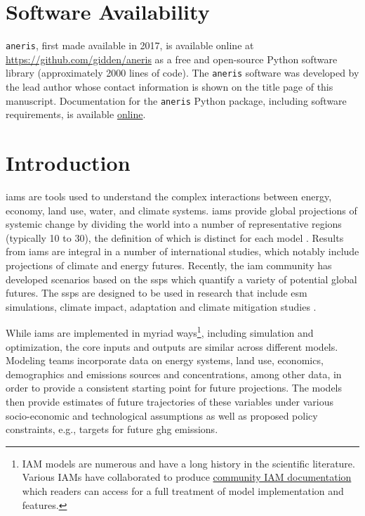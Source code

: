 \documentclass[review]{elsarticle}
\begin{document}
\linenumbers

\newpage
\section*{Software Availability}

\texttt{aneris}, first made available in 2017, is available online at
\url{https://github.com/gidden/aneris} as a free and open-source Python software
library (approximately 2000 lines of code). The \texttt{aneris} software was
developed by the lead author whose contact information is shown on the title
page of this manuscript. Documentation for the \texttt{aneris} Python package,
including software requirements, is available
\href{http://mattgidden.com/aneris/}{online}.

\newpage

\section{Introduction}

\glspl{iam} are tools used to understand the complex interactions between
energy, economy, land use, water, and climate systems. \glspl{iam} provide
global projections of systemic change by dividing the world into a number of
representative regions (typically 10 to 30), the definition of which is distinct
for each model \cite{krey_global_2014}. Results from \glspl{iam} are integral in
a number of international studies, which notably include projections of climate
and energy futures. Recently, the \gls{iam} community has developed scenarios
based on the \glspl{ssp} \cite{fujimori_ssp3:_2017, van_vuuren_energy_2017,
  calvin_ssp4:_2017, fricko_marker_2017, kriegler_fossil-fueled_2017} which
quantify a variety of potential global futures. The \glspl{ssp} are designed to
be used in research that include \gls{esm} simulations, climate impact,
adaptation and climate mitigation studies \cite{vuuren_new_2013}.

While \glspl{iam} are implemented in myriad ways\footnote{IAM models are
  numerous and have a long history in the scientific literature. Various IAMs
  have collaborated to produce
  \href{http://themasites.pbl.nl/models/advance/index.php/ADVANCE_wiki}{community
    IAM documentation} which readers can access for a full treatment of model
  implementation and features.}, including simulation and optimization, the core
inputs and outputs are similar across different models. Modeling teams
incorporate data on energy systems, land use, economics, demographics and
emissions sources and concentrations, among other data, in order to provide a
consistent starting point for future projections. The models then provide
estimates of future trajectories of these variables under various socio-economic
and technological assumptions as well as proposed policy constraints, e.g.,
targets for future \gls{ghg} emissions.
\end{document}

